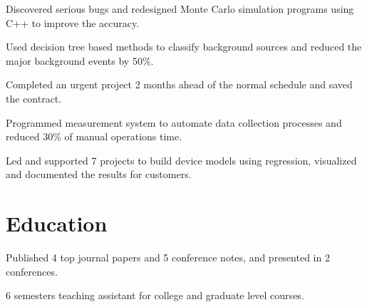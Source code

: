 \documentclass[letterpaper]{deedy-resume-openfont}
\begin{document}
\begin{tightemize}
\item Discovered serious bugs and redesigned Monte Carlo simulation programs using C++ to improve the accuracy.
\item Used decision tree based methods to classify background sources and reduced the major background events by 50\%.
\end{tightemize}
\sectionsep

\begin{tightemize}
\item Completed an urgent project 2 months ahead of the normal schedule and saved the contract.
\item Programmed measurement system to automate data collection processes and reduced 30\% of manual operations time.
\item Led and supported 7 projects to build device models using regression, visualized and documented the results for customers.
\end{tightemize}
\sectionsep





\section{Education} 

\begin{tightemize}
\item Published 4 top journal papers and 5 conference notes, and presented in 2 conferences.
\item 6 semesters teaching assistant for college and graduate level courses.
\end{tightemize}
\sectionsep
\end{document}
